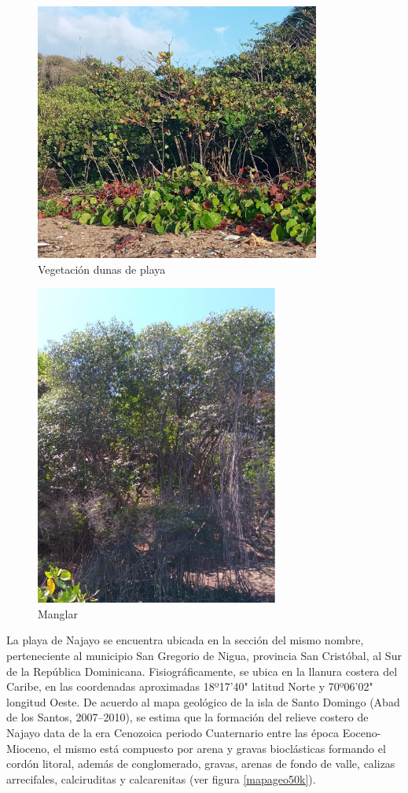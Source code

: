 \documentclass[11pt,]{article}
\begin{document}
\begin{figure}
\centering
\includegraphics[height=3.33333in]{Cocoloba_uvifera.jpg}
\caption{Vegetación dunas de playa\label{cocoloba}}
\end{figure}

\begin{figure}
\centering
\includegraphics[height=4.16667in]{mangle_rojo.png}
\caption{Manglar\label{manglerojo}}
\end{figure}

La playa de Najayo se encuentra ubicada en la sección del mismo nombre,
perteneciente al municipio San Gregorio de Nigua, provincia San
Cristóbal, al Sur de la República Dominicana. Fisiográficamente, se
ubica en la llanura costera del Caribe, en las coordenadas aproximadas
18º17'40" latitud Norte y 70º06'02" longitud Oeste. De acuerdo al mapa
geológico de la isla de Santo Domingo (Abad de los Santos, 2007--2010),
se estima que la formación del relieve costero de Najayo data de la era
Cenozoica periodo Cuaternario entre las época Eoceno-Mioceno, el mismo
está compuesto por arena y gravas bioclásticas formando el cordón
litoral, además de conglomerado, gravas, arenas de fondo de valle,
calizas arrecifales, calciruditas y calcarenitas (ver figura
\ref{mapageo50k}).
\end{document}
